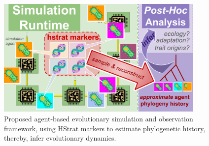 \begin{figure}[htbp]
\includegraphics[width=4in]{img/runtime-posthoc-schematic.pdf}
\caption{Proposed agent-based evolutionary simulation and observation framework, using HStrat markers to estimate phylogenetic history, thereby, infer evolutionary dynamics.}
\label{fig:runtime-posthoc-schematic}
\end{figure}